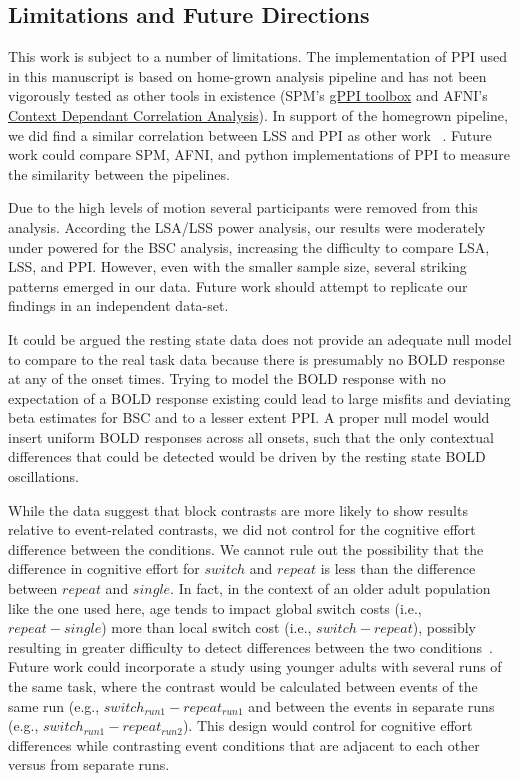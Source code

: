 \documentclass[phd,appendix,figures]{uithesis}
\begin{document}
\subsection{Limitations and Future Directions}
This work is subject to a number of limitations.
The implementation of PPI used in this manuscript is based on
home-grown analysis pipeline and has not been vigorously tested
as other tools in existence (SPM's \href{https://www.nitrc.org/projects/gppi}{gPPI toolbox}
and AFNI's \href{https://afni.nimh.nih.gov/CD-CorrAna}{Context Dependant Correlation Analysis}).
In support of the homegrown pipeline, we did find a similar correlation between LSS and PPI as
other work ~\cite{Di2019a}.
Future work could compare SPM, AFNI, and python implementations of PPI to measure the similarity
between the pipelines.

Due to the high levels of motion several participants were removed from this analysis.
According the LSA/LSS power analysis, our results were moderately under powered for the BSC analysis,
increasing the difficulty to compare LSA, LSS, and PPI.
However, even with the smaller sample size, several striking patterns emerged in our data.
Future work should attempt to replicate our findings in an independent data-set.

It could be argued the resting state data does not provide an adequate null model
to compare to the real task data because there is presumably no BOLD response at any
of the onset times.
Trying to model the BOLD response with no expectation of a BOLD response existing could lead
to large misfits and deviating beta estimates for BSC and to a lesser extent PPI.
A proper null model would insert uniform BOLD responses across all onsets, such that
the only contextual differences that could be detected would be driven by the
resting state BOLD oscillations.

While the data suggest that block contrasts are more likely to show results relative to event-related contrasts,
we did not control for the cognitive effort difference between the conditions.
We cannot rule out the possibility that the difference in cognitive effort for
$switch$ and $repeat$ is less than the difference between $repeat$ and $single$.
In fact, in the context of an older adult population like the one used here,
age tends to impact global switch costs (i.e., $repeat - single$) more than local
switch cost (i.e., $switch - repeat$), possibly resulting in greater difficulty to detect
differences between the two conditions~\cite{Wasylyshyn2011}.
Future work could incorporate a study using younger adults with several runs of the same task, where
the contrast would be calculated between events of the same run (e.g., $switch_{run1} - repeat_{run1}$
and between the events in separate runs (e.g., $switch_{run1} - repeat_{run2}$).
This design would control for cognitive effort differences while contrasting event conditions that are adjacent
to each other versus from separate runs.
\end{document}
